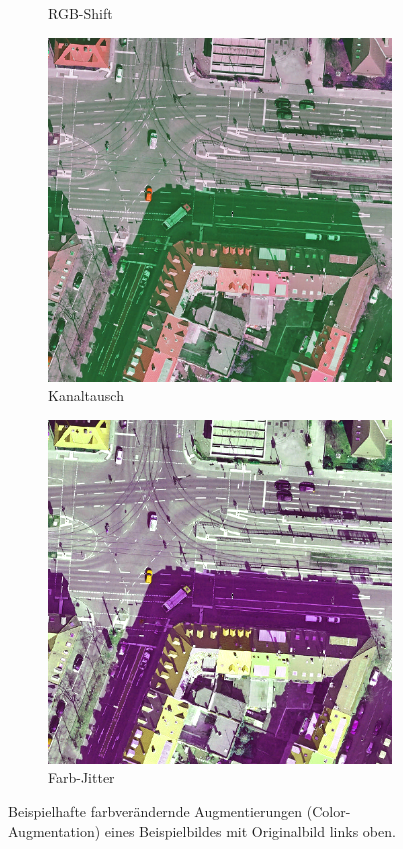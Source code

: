 \begin{figure}[h]
\begin{subfigure}{.32\textwidth}
		RGB-Shift
	\end{subfigure}
	\begin{subfigure}{.32\textwidth}
		\centering
		\includegraphics[width=1.\linewidth]{Bilder/color_aug/ChannelShuffle.png}
		Kanaltausch
	\end{subfigure}
	\begin{subfigure}{.32\textwidth}
		\centering
		\includegraphics[width=1.\linewidth]{Bilder/color_aug/ColorJitter.png}
		Farb-Jitter
	\end{subfigure} 

	\caption{Beispielhafte farbverändernde Augmentierungen (Color-Augmentation) eines Beispielbildes mit Originalbild links oben. }
	\label{fig:color-aug}
\end{figure}

